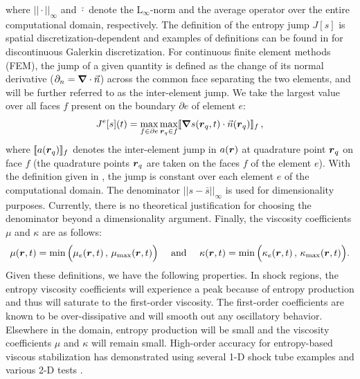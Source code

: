 %
where $|| \cdot ||_\infty$ and $\bar{\cdot}$ denote the L$_\infty$-norm and the average operator over the entire computational domain, respectively. The definition of the entropy jump $J[s]$ is spatial discretization-dependent and examples of definitions can be found in \cite{valentin} for discontinuous Galerkin discretization. For continuous finite element methods (FEM), the jump of a given quantity is defined as the change of its normal derivative ($\partial_n = \boldsymbol{\nabla} \cdot \vec{n}$) across the common face separating the two elements, and will be further referred to as the inter-element jump. We take the largest value over all faces $f$ present on the boundary $\partial e$ of element $e$:
%
\begin{equation}
\label{eq:jump_CFEM}
J^e[s](t) = \max_{f\in\partial e}  \max_{\boldsymbol r_q \in f} [\![\boldsymbol{\nabla} s(\boldsymbol r_q,t) \cdot \vec{n}(\boldsymbol r_q) ]\!]_f \, ,
\end{equation}
%
where $[\![a(\boldsymbol r_q)]\!]_f$ denotes the inter-element jump in $a(\boldsymbol r)$ at quadrature point $\boldsymbol r_q$ on face $f$ (the quadrature points $\boldsymbol r_q$ are taken on the faces $f$ of the element $e$). With the definition given in , the jump is constant over each element $e$ of the computational domain. 
The denominator $|| s - \bar{s} ||_\infty$ is used for dimensionality purposes.
Currently, there is no theoretical justification for choosing the denominator beyond a dimensionality argument. 
Finally, the viscosity coefficients $\mu$ and $\kappa$ are as follows:
%
\begin{equation}
\mu(\boldsymbol r,t)    = \min\Big( \mu_e(\boldsymbol r,t)   \,,\, \mu_{\max}(\boldsymbol r,t)    \Big) 
\quad \text{ and } \quad 
\kappa(\boldsymbol r,t) = \min\Big( \kappa_e(\boldsymbol r,t)\,,\, \kappa_{\max}(\boldsymbol r,t) \Big).
\end{equation}
%
Given these definitions, we have the following properties.
In shock regions, the entropy viscosity coefficients will experience a peak because of entropy production and thus will saturate to the first-order viscosity. The first-order coefficients are known to be over-dissipative and will smooth out any oscillatory behavior. Elsewhere in the domain, entropy production will be small and the viscosity coefficients $\mu$ and $\kappa$ will remain small. %
High-order accuracy for entropy-based viscous stabilization has demonstrated using several 1-D shock tube examples and various 2-D tests \cite{jlg1, jlg2, valentin}.

